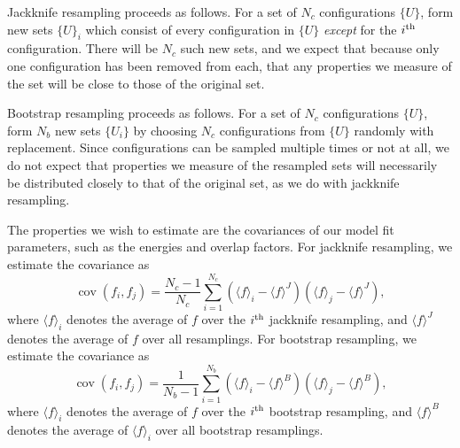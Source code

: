 Jackknife resampling proceeds as follows. For a set of $N_c$ configurations $\{U\}$, form new sets $\{U\}_i$ which consist of every configuration in $\{U\}$ \emph{except} for the $i^{\rm{th}}$ configuration. There will be $N_c$ such new sets, and we expect that because only one configuration has been removed from each, that any properties we measure of the set will be close to those of the original set.

Bootstrap resampling proceeds as follows. For a set of $N_c$ configurations $\{U\}$, form $N_b$ new sets $\{U_i\}$ by choosing $N_c$ configurations from $\{U\}$ randomly with replacement. Since configurations can be sampled multiple times or not at all, we do not expect that properties we measure of the resampled sets will necessarily be distributed closely to that of the original set, as we do with jackknife resampling.

The properties we wish to estimate are the covariances of our model fit parameters, such as the energies and overlap factors. For jackknife resampling, we estimate the covariance as
\begin{equation}
    \operatorname{cov}(f_i, f_j) = \frac{N_c - 1}{N_c}\sum_{i=1}^{N_c}\left(\langle f \rangle_i - \langle f \rangle^J\right)\left(\langle f \rangle_j - \langle f \rangle^J\right),
\end{equation}
where $\langle f \rangle_i$ denotes the average of $f$ over the $i^{\rm{th}}$ jackknife resampling, and $\langle f \rangle^J$ denotes the average of $f$ over all resamplings. For bootstrap resampling, we estimate the covariance as
\begin{equation}
    \operatorname{cov}(f_i, f_j) = \frac{1}{N_b-1}\sum_{i=1}^{N_b}\left(\langle f \rangle_i - \langle f \rangle^B\right)\left(\langle f \rangle_j - \langle f \rangle^B\right),
\end{equation}
where $\langle f \rangle_i$ denotes the average of $f$ over the $i^{\rm{th}}$ bootstrap resampling, and $\langle f \rangle^B$ denotes the average of $\langle f \rangle_i$ over all bootstrap resamplings.
